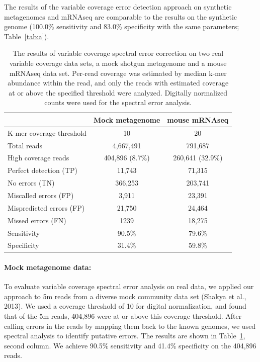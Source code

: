 \documentclass{article}
\begin{document}
The results of the variable coverage error detection approach on
synthetic metagenomes and mRNAseq are comparable to the results
on the synthetic genome (100.0\% sensitivity and 83.0\%
specificity with the same parameters; Table~\ref{tab:a}).


\begin{table}
\begin{tabular}{|l|c||c|}
\hline
& Mock metagenome & mouse mRNAseq \\
\hline
K-mer coverage threshold   & 10              & 20 \\
Total reads                & 4,667,491       & 791,687 \\
High coverage reads        & 404,896 (8.7\%) & 260,641 (32.9\%) \\
\hline
Perfect detection (TP)     & 11,743          & 71,315 \\
No errors (TN)             & 366,253         & 203,741 \\
Miscalled errors (FP)      & 3,911           & 23,391 \\
Mispredicted errors (FP)   & 21,750          & 24,464 \\
Missed errors (FN)         & 1239            & 18,275 \\
\hline
Sensitivity & 90.5\% & 79.6\% \\
Specificity & 31.4\% & 59.8\% \\
\hline
\end{tabular}
\label{tab:spectra_variable_real}

\caption{The results of variable coverage spectral error correction on
  two real variable coverage data sets, a mock shotgun metagenome and
  a mouse mRNAseq data set. Per-read coverage was estimated by median
  k-mer abundance within the read, and only the reads with estimated
  coverage at or above the specified threshold were analyzed.
  Digitally normalized counts were used for the spectral error analysis.}

\end{table}

\paragraph{Mock metagenome data:}


To evaluate variable coverage spectral error analysis on real data, we
applied our approach to 5m reads from a diverse mock community data
set (Shakya et al., 2013). We used a coverage threshold of 10 for
digital normalization, and found that of the 5m reads, 404,896 were at
or above this coverage threshold.  After calling errors in the reads
by mapping them back to the known genomes, we used spectral analysis
to identify putative errors.  The results are shown in
Table~\ref{tab:spectra_variable_real}, second column.  We achieve
90.5\% sensitivity and 41.4\% specificity on the 404,896 reads.
\end{document}
